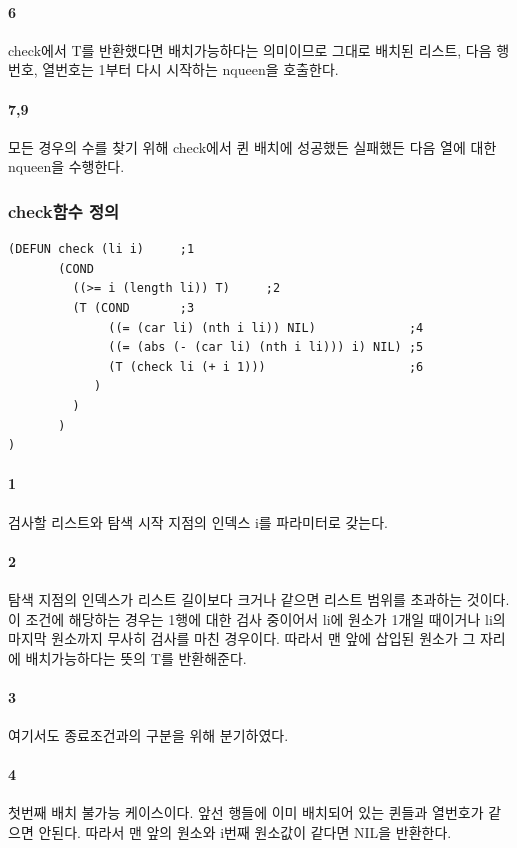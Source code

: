 \documentclass{oblivoir}
\begin{document}
\paragraph*{6}check에서 T를 반환했다면 배치가능하다는 의미이므로 그대로 배치된 리스트, 다음 행번호, 열번호는 1부터 다시 시작하는 nqueen을 호출한다.

\paragraph*{7,9}모든 경우의 수를 찾기 위해 check에서 퀸 배치에 성공했든 실패했든 다음 열에 대한 nqueen을 수행한다. 

\subsubsection{check함수 정의}
\begin{verbatim}
(DEFUN check (li i)     ;1
       (COND
         ((>= i (length li)) T)     ;2
         (T (COND       ;3
              ((= (car li) (nth i li)) NIL)             ;4
              ((= (abs (- (car li) (nth i li))) i) NIL) ;5
              (T (check li (+ i 1)))                    ;6
            )
         )
       )
)
\end{verbatim}
\paragraph*{1}
검사할 리스트와 탐색 시작 지점의 인덱스 i를 파라미터로 갖는다.

\paragraph*{2}
탐색 지점의 인덱스가 리스트 길이보다 크거나 같으면 리스트 범위를 초과하는 것이다. 
이 조건에 해당하는 경우는 1행에 대한 검사 중이어서 li에 원소가 1개일 때이거나 li의 마지막 원소까지 무사히 검사를 마친 경우이다. 따라서 맨 앞에 삽입된 원소가 그 자리에 배치가능하다는 뜻의 T를 반환해준다.

\paragraph*{3}
여기서도 종료조건과의 구분을 위해 분기하였다.

\paragraph*{4}
첫번째 배치 불가능 케이스이다. 앞선 행들에 이미 배치되어 있는 퀸들과 열번호가 같으면 안된다. 따라서 맨 앞의 원소와 i번째 원소값이 같다면 NIL을 반환한다.
\end{document}
